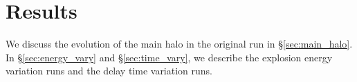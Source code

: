 \documentclass[fleqn,usenatbib]{mnras}
\begin{document}
%


\section{Results} \label{sec:results}

We discuss the evolution of the main halo in the original run in \S \ref{sec:main_halo}. In \S \ref{sec:energy_vary} and \S \ref{sec:time_vary}, we describe the explosion energy variation runs and the delay time variation runs. 
\end{document}
